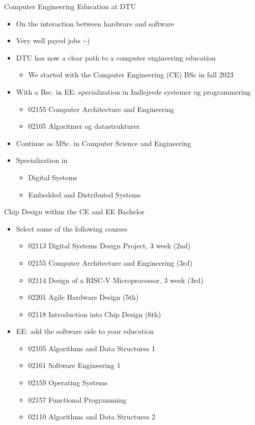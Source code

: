 \begin{frame}[fragile]{Computer Engineering Education at DTU}
\begin{itemize}
\item On the interaction between hardware and software
\item Very well payed jobs :-)
\item DTU has now a clear path to a computer engineering education
\begin{itemize}
\item We started with the Computer Engineering (CE) BSc in fall 2023
\end{itemize}
\item With a Bsc. in EE: specialization in Indlejrede systemer og programmering
\begin{itemize}
\item 02155 Computer Architecture and Engineering
\item 02105 Algoritmer og datastrukturer
\end{itemize}
\item Continue as MSc. in Computer Science and Engineering
\item Specialization in
\begin{itemize}
\item Digital Systems
\item Embedded and Distributed Systems
\end{itemize}
\end{itemize}
\end{frame}

\begin{frame}[fragile]{Chip Design within the CE and EE Bachelor}
\begin{itemize}
\item Select some of the following courses
\begin{itemize}
\item 02113 Digital Systems Design Project, 3 week (2nd)
\item 02155 Computer Architecture and Engineering (3rd)
\item 02114 Design of a RISC-V Microprocessor, 3 week (3rd)
\item 02201 Agile Hardware Design (5th)
\item 02118 Introduction into Chip Design (6th)
\end{itemize}
\item EE: add the software side to your education
\begin{itemize}
\item 02105 Algorithms and Data Structures 1
\item 02161 Software Engineering 1
\item 02159 Operating Systems
\item 02157 Functional Programming
\item 02110 Algorithms and Data Structures 2
\end{itemize}
\end{itemize}
\end{frame}

